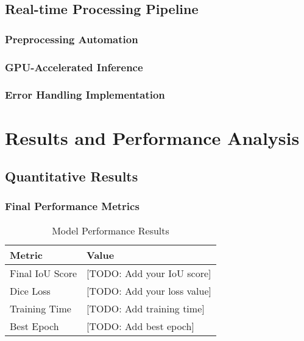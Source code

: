 \documentclass[12pt,a4paper]{report}
\begin{document}
\subsection{Real-time Processing Pipeline}

\subsubsection{Preprocessing Automation}

\subsubsection{GPU-Accelerated Inference}

\subsubsection{Error Handling Implementation}

\section{Results and Performance Analysis}

\subsection{Quantitative Results}

\subsubsection{Final Performance Metrics}

\begin{table}[H]
\centering
\caption{Model Performance Results}
\begin{tabular}{|l|l|}
\hline
\textbf{Metric} & \textbf{Value} \\
\hline
Final IoU Score & [TODO: Add your IoU score] \\
\hline
Dice Loss & [TODO: Add your loss value] \\
\hline
Training Time & [TODO: Add training time] \\
\hline
Best Epoch & [TODO: Add best epoch] \\
\hline
\end{tabular}
\end{table}
\end{document}
